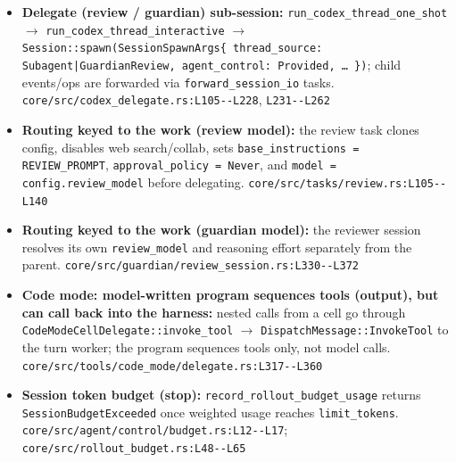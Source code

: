 \begin{itemize}
\item \textbf{Delegate (review / guardian) sub-session:} \texttt{run\_\allowbreak{}codex\_\allowbreak{}thread\_\allowbreak{}one\_\allowbreak{}shot} $\rightarrow$ \texttt{run\_\allowbreak{}codex\_\allowbreak{}thread\_\allowbreak{}interactive} $\rightarrow$ \texttt{Session:\allowbreak{}:\allowbreak{}spawn(\allowbreak{}SessionSpawnArgs\{ thread\_\allowbreak{}source:\allowbreak{} Subagent|GuardianReview, agent\_\allowbreak{}control:\allowbreak{} Provided, \ldots{} \})}; child events/ops are forwarded via \texttt{forward\_\allowbreak{}session\_\allowbreak{}io} tasks. \texttt{core/\allowbreak{}src/\allowbreak{}codex\_\allowbreak{}delegate.\allowbreak{}rs:\allowbreak{}L105-\allowbreak{}-\allowbreak{}L228}, \texttt{L231-\allowbreak{}-\allowbreak{}L262}
\item \textbf{Routing keyed to the work (review model):} the review task clones config, disables web search/collab, sets \texttt{base\_\allowbreak{}instructions = REVIEW\_\allowbreak{}PROMPT}, \texttt{approval\_\allowbreak{}policy = Never}, and \texttt{model = config.\allowbreak{}review\_\allowbreak{}model} before delegating. \texttt{core/\allowbreak{}src/\allowbreak{}tasks/\allowbreak{}review.\allowbreak{}rs:\allowbreak{}L105-\allowbreak{}-\allowbreak{}L140}
\item \textbf{Routing keyed to the work (guardian model):} the reviewer session resolves its own \texttt{review\_\allowbreak{}model} and reasoning effort separately from the parent. \texttt{core/\allowbreak{}src/\allowbreak{}guardian/\allowbreak{}review\_\allowbreak{}session.\allowbreak{}rs:\allowbreak{}L330-\allowbreak{}-\allowbreak{}L372}
\item \textbf{Code mode: model-written program sequences tools (output), but can call back into the harness:} nested calls from a cell go through \texttt{CodeModeCellDelegate:\allowbreak{}:\allowbreak{}invoke\_\allowbreak{}tool} $\rightarrow$ \texttt{DispatchMessage:\allowbreak{}:\allowbreak{}InvokeTool} to the turn worker; the program sequences tools only, not model calls. \texttt{core/\allowbreak{}src/\allowbreak{}tools/\allowbreak{}code\_\allowbreak{}mode/\allowbreak{}delegate.\allowbreak{}rs:\allowbreak{}L317-\allowbreak{}-\allowbreak{}L360}
\item \textbf{Session token budget (stop):} \texttt{record\_\allowbreak{}rollout\_\allowbreak{}budget\_\allowbreak{}usage} returns \texttt{SessionBudgetExceeded} once weighted usage reaches \texttt{limit\_\allowbreak{}tokens}. \texttt{core/\allowbreak{}src/\allowbreak{}agent/\allowbreak{}control/\allowbreak{}budget.\allowbreak{}rs:\allowbreak{}L12-\allowbreak{}-\allowbreak{}L17}; \texttt{core/\allowbreak{}src/\allowbreak{}rollout\_\allowbreak{}budget.\allowbreak{}rs:\allowbreak{}L48-\allowbreak{}-\allowbreak{}L65}

\end{itemize}
